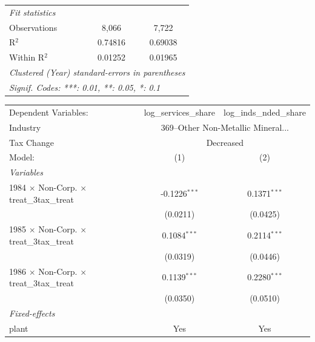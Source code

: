 \documentclass[
  12pt]{article}
\theoremstyle{definition}
\theoremstyle{remark}
\begin{document}
\begin{table}
\begin{minipage}{\linewidth}
\begin{tabular}{lcc}
   \midrule
   \emph{Fit statistics}\\
   Observations                                            & 8,066                  & 7,722\\  
   R$^2$                                                   & 0.74816                & 0.69038\\  
   Within R$^2$                                            & 0.01252                & 0.01965\\  
   \midrule \midrule
   \multicolumn{3}{l}{\emph{Clustered (Year) standard-errors in parentheses}}\\
   \multicolumn{3}{l}{\emph{Signif. Codes: ***: 0.01, **: 0.05, *: 0.1}}\\
\end{tabular}
\par\endgroup
\begingroup
\centering
\begin{tabular}{lcc}
   \tabularnewline \midrule \midrule
   Dependent Variables:                                    & log\_services\_share   & log\_inds\_nded\_share\\     
   Industry & \multicolumn{2}{c}{369–Other Non-Metallic Mineral...} \\ 
   Tax Change & \multicolumn{2}{c}{Decreased} \\ 
   Model:                                                  & (1)                    & (2)\\  
   \midrule
   \emph{Variables}\\
   1984 $\times$ Non-Corp. $\times$ treat\_3tax\_treat     & -0.1226$^{***}$        & 0.1371$^{***}$\\   
                                                           & (0.0211)               & (0.0425)\\   
   1985 $\times$ Non-Corp. $\times$ treat\_3tax\_treat     & 0.1084$^{***}$         & 0.2114$^{***}$\\   
                                                           & (0.0319)               & (0.0446)\\   
   1986 $\times$ Non-Corp. $\times$ treat\_3tax\_treat     & 0.1139$^{***}$         & 0.2280$^{***}$\\   
                                                           & (0.0350)               & (0.0510)\\   
   \midrule
   \emph{Fixed-effects}\\
   plant                                                   & Yes                    & Yes\\  

\end{tabular}
\end{minipage}
\end{table}
\end{document}
